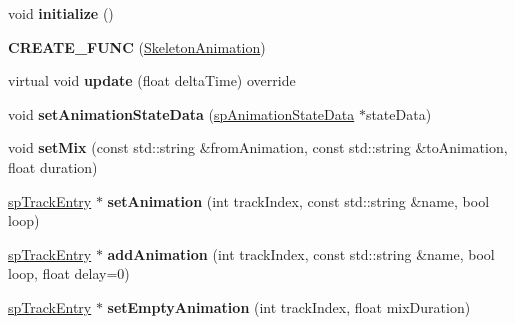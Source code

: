 \begin{DoxyCompactItemize}
\item 
\mbox{\label{classspine_1_1SkeletonAnimation_a2af425523169eedd047db8631a5884c6}} 
void {\bfseries initialize} ()
\item 
\mbox{\label{classspine_1_1SkeletonAnimation_ae4a1e17f3d039a1ce7bf91da489bde0e}} 
{\bfseries C\+R\+E\+A\+T\+E\+\_\+\+F\+U\+NC} (\hyperlink{classspine_1_1SkeletonAnimation}{Skeleton\+Animation})
\item 
\mbox{\label{classspine_1_1SkeletonAnimation_a59b7f2e1b38824c07dd2530f50fb90f0}} 
virtual void {\bfseries update} (float delta\+Time) override
\item 
\mbox{\label{classspine_1_1SkeletonAnimation_a8c3eb769dd4f30a2324d9a66277068ca}} 
void {\bfseries set\+Animation\+State\+Data} (\hyperlink{structspAnimationStateData}{sp\+Animation\+State\+Data} $\ast$state\+Data)
\item 
\mbox{\label{classspine_1_1SkeletonAnimation_a33cb9b6a5985866155ccf150eaa9734c}} 
void {\bfseries set\+Mix} (const std\+::string \&from\+Animation, const std\+::string \&to\+Animation, float duration)
\item 
\mbox{\label{classspine_1_1SkeletonAnimation_a216e690bafdcbaefe3a9a9bc595edd9a}} 
\hyperlink{structspTrackEntry}{sp\+Track\+Entry} $\ast$ {\bfseries set\+Animation} (int track\+Index, const std\+::string \&name, bool loop)
\item 
\mbox{\label{classspine_1_1SkeletonAnimation_acb6aa5ee5de8224a65adba01c27bff72}} 
\hyperlink{structspTrackEntry}{sp\+Track\+Entry} $\ast$ {\bfseries add\+Animation} (int track\+Index, const std\+::string \&name, bool loop, float delay=0)
\item 
\mbox{\label{classspine_1_1SkeletonAnimation_ab95714dcd9d56484b2cc67c033680dc9}} 
\hyperlink{structspTrackEntry}{sp\+Track\+Entry} $\ast$ {\bfseries set\+Empty\+Animation} (int track\+Index, float mix\+Duration)
\item 
\mbox{\label{classspine_1_1SkeletonAnimation_a36d7a0450531679a86c0d27e8cce1060}} 

\end{DoxyCompactItemize}
